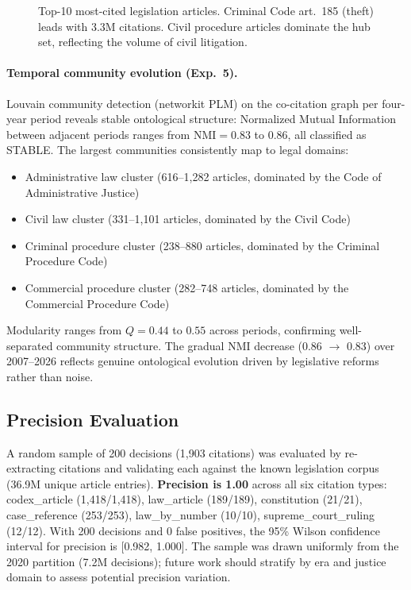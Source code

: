 \documentclass[11pt]{article}
\begin{document}
\begin{figure}[t]
\centering

\caption{Top-10 most-cited legislation articles. Criminal Code art.~185 (theft) leads with 3.3M citations. Civil procedure articles dominate the hub set, reflecting the volume of civil litigation.}
\label{fig:top-articles}
\end{figure}

\paragraph{Temporal community evolution (Exp.~5).}
Louvain community detection (networkit PLM) on the co-citation graph per four-year period reveals stable ontological structure: Normalized Mutual Information between adjacent periods ranges from $\text{NMI} = 0.83$ to $0.86$, all classified as STABLE.
The largest communities consistently map to legal domains:
\begin{itemize}[leftmargin=*, nosep]
  \item Administrative law cluster (616--1,282 articles, dominated by the Code of Administrative Justice)
  \item Civil law cluster (331--1,101 articles, dominated by the Civil Code)
  \item Criminal procedure cluster (238--880 articles, dominated by the Criminal Procedure Code)
  \item Commercial procedure cluster (282--748 articles, dominated by the Commercial Procedure Code)
\end{itemize}
Modularity ranges from $Q = 0.44$ to $0.55$ across periods, confirming well-separated community structure.
The gradual NMI decrease (0.86 $\to$ 0.83) over 2007--2026 reflects genuine ontological evolution driven by legislative reforms rather than noise.

\subsection{Precision Evaluation}
\label{sec:precision}

A random sample of 200 decisions (1,903 citations) was evaluated by re-extracting citations and validating each against the known legislation corpus (36.9M unique article entries).
\textbf{Precision is 1.00} across all six citation types: codex\_article (1,418/1,418), law\_article (189/189), constitution (21/21), case\_reference (253/253), law\_by\_number (10/10), supreme\_court\_ruling (12/12).
With 200 decisions and 0 false positives, the 95\% Wilson confidence interval for precision is [0.982, 1.000]. The sample was drawn uniformly from the 2020 partition (7.2M decisions); future work should stratify by era and justice domain to assess potential precision variation.
\end{document}
